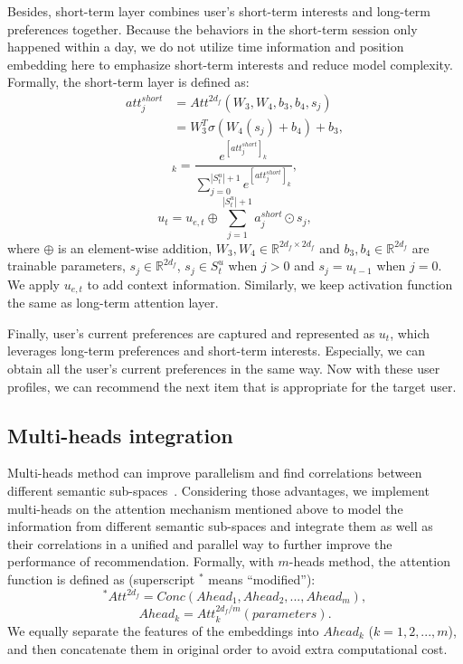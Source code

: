 \documentclass[preprint,12pt]{elsarticle}
\begin{document}
\begin{sloppypar}
Besides, short-term layer combines user's short-term interests and long-term preferences together. Because the behaviors in the short-term session only happened within a day, we do not utilize time information and position embedding here to emphasize short-term interests and reduce model complexity. Formally, the short-term layer is defined as:
\begin{equation}
\begin{aligned}
att^{short}_j &= Att^{2d_{f}}(W_3, W_4, b_3, b_4, s_j) \\&= W_3^T\sigma (W_4(s_j) + b_4) + b_3,
\end{aligned}
\end{equation}
\begin{equation}
[a^{short}_j]_k = \frac{e^{[att^{short}_j]_k}}{\sum_{j=0}^{|S^{u}_{t}|+1} e^{[att^{short}_j]_k}},
\end{equation}
\begin{equation}
u_{t} = u_{e,t} \oplus \sum_{j=1}^{|S^{u}_{t}|+1} a^{short}_j\odot s_j,
\end{equation}
where $\oplus$ is an element-wise addition, $W_3, W_4\in \mathbb{R}^{2d_{f}\times 2d_{f}}$ and $b_3, b_4\in \mathbb{R}^{2d_{f}}$ are trainable parameters, $s_j\in \mathbb{R}^{2d_{f}}$, $s_j\in S^{u}_{t}$ when $j > 0$ and $s_j = u_{t-1}$ when $j = 0$. We apply $u_{e,t}$ to add context information. Similarly, we keep activation function the same as long-term attention layer.

Finally, user's current preferences are captured and represented as $u_{t}$, which leverages long-term preferences and short-term interests. Especially, we can obtain all the user's current preferences in the same way. Now with these user profiles, we can recommend the next item that is appropriate for the target user.

\subsection{Multi-heads integration}

Multi-heads method can improve parallelism and find correlations between different semantic sub-spaces~\cite{zheng2017joint, huang2018csan, zhou2018atrank, cao2020position}. Considering those advantages, we implement multi-heads on the attention mechanism mentioned above to model the information from different semantic sub-spaces and integrate them as well as their correlations in a unified and parallel way to further improve the performance of recommendation. Formally, with $m$-heads method, the attention function is defined as (superscript $^*$ means ``modified''):
\begin{equation}
^*Att^{2d_{f}} = Conc(Ahead_1,Ahead_2,...,Ahead_m),
\end{equation}
\begin{equation}
Ahead_k = Att^{2d_{f}/ m}_k(parameters).\label{eq:2}
\end{equation}
We equally separate the features of the embeddings into $Ahead_k$ ($k=1,2,...,m$), and then concatenate them in original order to avoid extra computational cost.


\end{sloppypar}
\end{document}

